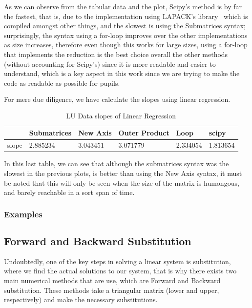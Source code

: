 As we can observe from the tabular data and the plot, Scipy's method is by far the fastest, that is, due to the implementation using LAPACK's library~\cite{lapack99} which is compiled amongst other things, and the slowest is using the Submatrices syntax; surprisingly, the syntax using a for-loop improves over the other implementations as size increases, therefore even though this works for large sizes, using a for-loop that implements the reduction is the best choice overall the other methods (without accounting for Scipy's) since it is more readable and easier to understand, which is a key aspect in this work since we are trying to make the code as readable as possible for pupils.

For mere due diligence, we have calculate the slopes using  linear regression.
\begin{table}[H]
    \centering
    \begin{tabular}{|l|l|l|l|l|l|}
    \hline
        \textbf{} & \textbf{Submatrices} & \textbf{New Axis} & \textbf{Outer Product} & \textbf{Loop} & \textbf{scipy} \\ \hline
        slope & 2.885234 & 3.043451 & 3.071779 & 2.334054 & 1.813654 \\ \hline
    \end{tabular}
    \caption{LU Data slopes of Linear Regression}
\end{table}
In this last table, we can see that although the submatrices syntax was the slowest in the previous plots, is better than using the New Axis syntax, it must be noted that this will only be seen when the size of the matrix is humongous, and barely reachable in a sort span of time. 

\subsubsection{Examples}
	


\subsection{Forward and Backward Substitution}
Undoubtedly, one of the key steps in solving a linear system is substitution, where we find the actual solutions to our system, that is why there exists two main numerical methods that are use, which are Forward and Backward substitution. These methods take a triangular matrix (lower and upper, respectively) and make the necessary substitutions.

